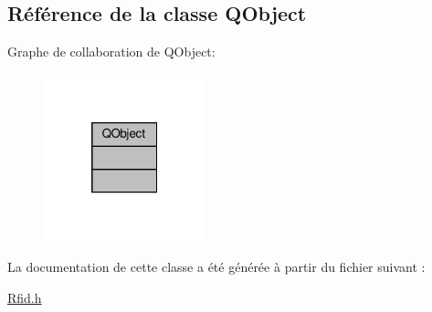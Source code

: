 \hypertarget{class_q_object}{}\subsection{Référence de la classe Q\+Object}
\label{class_q_object}


Graphe de collaboration de Q\+Object\+:
\nopagebreak
\begin{figure}[H]
\begin{center}
\leavevmode
\includegraphics[width=133pt]{class_q_object__coll__graph}
\end{center}
\end{figure}


La documentation de cette classe a été générée à partir du fichier suivant \+:\begin{DoxyCompactItemize}
\item 
\hyperlink{_rfid_8h}{Rfid.\+h}\end{DoxyCompactItemize}
